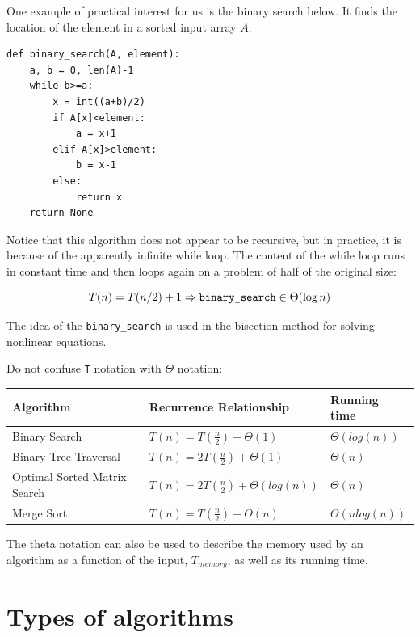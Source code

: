 \documentclass[justified, sixbynine]{tufte-book}
\def\ft{\small\tt}
\theoremstyle{plain}%
\newtheorem * {corollary}{Corollary}
\theoremstyle{definition}
\theoremstyle{remark}
\newtheorem * {remark}{Remark}
\newtheorem * {note}{Note}
\begin{document}
\begin{fullwidth}
One example of practical interest for us is the binary search below. It finds the location of the element in a sorted input array $A$:

\begin{lstlisting}
def binary_search(A, element):
    a, b = 0, len(A)-1
    while b>=a:
        x = int((a+b)/2)
        if A[x]<element:
            a = x+1
        elif A[x]>element:
            b = x-1
        else:
            return x
    return None
\end{lstlisting}

Notice that this algorithm does not appear to be recursive, but in practice, it is because of the apparently infinite while loop. The content of the while loop runs in constant time and then loops again on a problem of half of the original size:

\begin{equation}
T(n)=T(n/2)+1\Rightarrow \text{{\tt binary\_search}}\in \Theta(\log n)
\end{equation}

The idea of the {\ft binary\_search} is used in the bisection method for solving nonlinear equations.

Do not confuse {\ft T} notation with $\Theta$ notation:

\begin{table}
\begin{tabular}{|l|l|l|}\hline
Algorithm & Recurrence Relationship & Running time \\ \hline
Binary Search & $T(n) = T(\frac n 2) + \Theta (1)$ & $\Theta(log(n))$ \\ \hline
Binary Tree Traversal & $T(n) = 2T(\frac n 2) + \Theta (1)$ & $\Theta(n)$ \\ \hline
Optimal Sorted Matrix Search & $T(n) = 2T(\frac n 2) + \Theta (log(n))$ & $\Theta(n)$ \\ \hline
Merge Sort & $T(n) = T(\frac n 2) + \Theta (n)$ & $\Theta(n log(n))$ \\ \hline
\end{tabular}
\label{table1}
\end{table}

The theta notation can also be used to describe the memory used by an algorithm as a function of the input, $T_{memory}$, as well as its running time.

\goodbreak\section{Types of algorithms}


\end{fullwidth}
\end{document}
